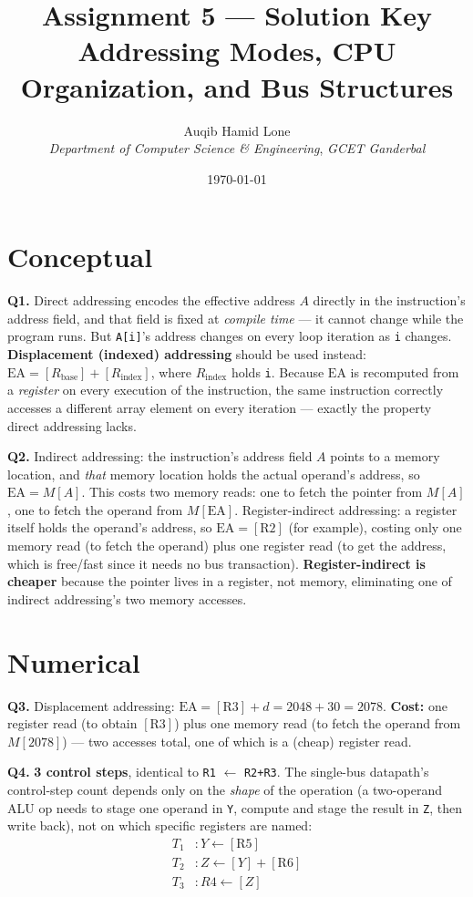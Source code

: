 \documentclass[11pt]{article}
\title{Assignment 5 --- Solution Key\\\large Addressing Modes, CPU Organization, and Bus Structures}
\author{Auqib Hamid Lone\\[0.3em]
  \emph{Department of Computer Science \& Engineering}, \emph{GCET Ganderbal}}
\date{\today}
\begin{document}
\maketitle

\section{Conceptual}

\textbf{Q1.} Direct addressing encodes the effective address $A$ directly in the instruction's address field, and that field is fixed at \emph{compile time} --- it cannot change while the program runs. But \texttt{A[i]}'s address changes on every loop iteration as \texttt{i} changes. \textbf{Displacement (indexed) addressing} should be used instead: $\text{EA} = [R_{\text{base}}] + [R_{\text{index}}]$, where $R_{\text{index}}$ holds \texttt{i}. Because $\text{EA}$ is recomputed from a \emph{register} on every execution of the instruction, the same instruction correctly accesses a different array element on every iteration --- exactly the property direct addressing lacks.

\textbf{Q2.} Indirect addressing: the instruction's address field $A$ points to a memory location, and \emph{that} memory location holds the actual operand's address, so $\text{EA} = M[A]$. This costs two memory reads: one to fetch the pointer from $M[A]$, one to fetch the operand from $M[\text{EA}]$. Register-indirect addressing: a register itself holds the operand's address, so $\text{EA} = [\text{R2}]$ (for example), costing only one memory read (to fetch the operand) plus one register read (to get the address, which is free/fast since it needs no bus transaction). \textbf{Register-indirect is cheaper} because the pointer lives in a register, not memory, eliminating one of indirect addressing's two memory accesses.

\section{Numerical}

\textbf{Q3.} Displacement addressing: $\text{EA} = [\text{R3}] + d = 2048 + 30 = 2078$. \textbf{Cost:} one register read (to obtain $[\text{R3}]$) plus one memory read (to fetch the operand from $M[2078]$) --- two accesses total, one of which is a (cheap) register read.

\textbf{Q4.} \textbf{3 control steps}, identical to \texttt{R1} $\gets$ \texttt{R2+R3}. The single-bus datapath's control-step count depends only on the \emph{shape} of the operation (a two-operand ALU op needs to stage one operand in \texttt{Y}, compute and stage the result in \texttt{Z}, then write back), not on which specific registers are named:
\[
\begin{aligned}
T_1&: Y \gets [\text{R5}] \\
T_2&: Z \gets [Y] + [\text{R6}] \\
T_3&: R4 \gets [Z]
\end{aligned}
\]
\end{document}
